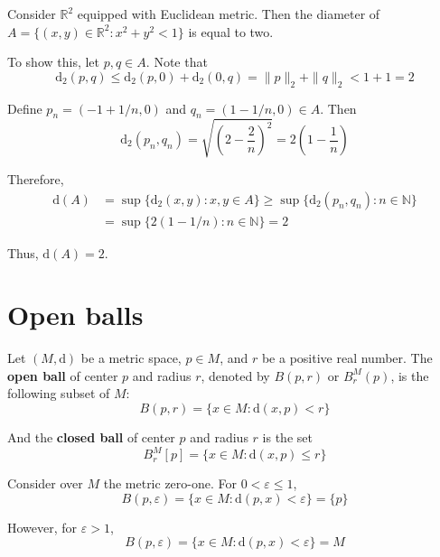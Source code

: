 \begin{example}
	Consider $\mathbb{R}^2$ equipped with Euclidean metric. Then the diameter of $A = \{ (x,y) \in \mathbb{R}^2 : x^2 + y^2 < 1 \}$ is equal to two.
	
	To show this, let $p,q \in A$. Note that
	\[
		\mathrm{d}_2(p,q) \leq \mathrm{d}_2(p,0) + \mathrm{d}_2(0,q) = \| p \|_2 + \| q \|_2 < 1 + 1 = 2
	\]
	
	Define $p_n = \left( -1 + 1/n, 0 \right)$ and $q_n = \left( 1 - 1/n, 0 \right) \in A$. Then
	\[
		\mathrm{d}_2(p_n, q_n) = \sqrt{\left( 2 - \frac{2}{n}\right)^2} = 2 \left( 1 - \frac{1}{n} \right)
	\]
	
	Therefore,
	\begin{equation*}
		\begin{aligned}
			\mathrm{d}(A) &= \sup \{ \mathrm{d}_2(x,y) : x, y \in A \} \geq \sup \{ \mathrm{d}_2(p_n, q_n) : n \in \mathbb{N} \} \\
			&= \sup \{ 2(1-1/n) : n \in \mathbb{N} \} = 2
		\end{aligned}
	\end{equation*}
	
	Thus, $\mathrm{d}(A) = 2$.
\end{example}

\section{Open balls}

\begin{definition}
	Let $(M, \mathrm{d})$ be a metric space, $p \in M$, and $r$ be a positive real number. The \textbf{open ball} of center $p$ and radius $r$, denoted by $B(p, r)$ or $B_r^M(p)$, is the following subset of $M$:
	\[
		B(p, r) = \{ x \in M : \mathrm{d}(x, p) < r \}
	\]

	And the \textbf{closed ball} of center $p$ and radius $r$ is the set
	\[
		B_r^M[p] = \{ x \in M : \mathrm{d}(x, p) \leq r \}
	\]
\end{definition}

\begin{example}
	Consider over $M$ the metric zero-one. For $0 < \varepsilon \leq 1$,
	\[
		B(p, \varepsilon) = \{ x \in M : \mathrm{d}(p,x) < \varepsilon \} = \{ p \}
	\]
	
	However, for $\varepsilon > 1$,
	\[
		B(p, \varepsilon) = \{ x \in M: \mathrm{d}(p,x) < \varepsilon \} = M
	\]
\end{example}
	
